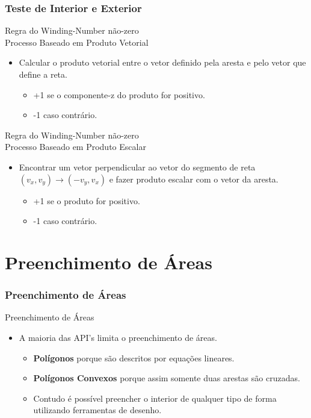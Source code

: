 \documentclass{beamer}
\begin{document}
\begin{frame}
\frametitle{Teste de Interior e Exterior}

		\begin{block}{Regra do Winding-Number não-zero \\ Processo Baseado em Produto Vetorial}
		\begin{itemize}
			\item Calcular o produto vetorial entre o vetor definido pela aresta e pelo vetor que define a reta.
			\begin{itemize}
				\item +1 se o componente-z do produto for positivo.
				\item -1 caso contrário.
			\end{itemize}
		\end{itemize}
		\end{block}
		
		\begin{block}{Regra do Winding-Number não-zero \\ Processo Baseado em Produto Escalar}
		\begin{itemize}
			\item Encontrar um vetor perpendicular ao vetor do segmento de reta $(v_x,v_y) \to (-v_y,v_x)$ e fazer produto escalar com o vetor da aresta.
			\begin{itemize}
				\item +1 se o produto for positivo.
				\item -1 caso contrário.
			\end{itemize}
		\end{itemize}
		\end{block}
	
\end{frame}


\section{Preenchimento de Áreas}
\begin{frame}
\frametitle{Preenchimento de Áreas}

		\begin{block}{Preenchimento de Áreas}
		\begin{itemize}
			\item A maioria das API's limita o preenchimento de áreas.
				\begin{itemize}
					\item \textbf{Polígonos} porque são descritos por equações lineares.
					\item \textbf{Polígonos Convexos} porque assim somente duas arestas são cruzadas.
					\item Contudo é possível preencher o interior de qualquer tipo de forma utilizando ferramentas de desenho.
				\end{itemize}
		\end{itemize}
		\end{block}
	
\end{frame}
\end{document}
